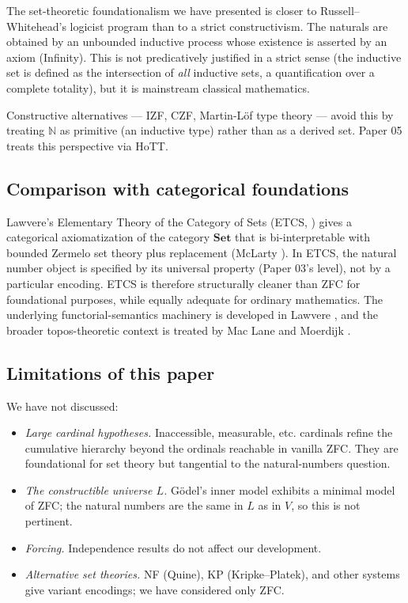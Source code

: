 \documentclass[12pt]{article}
\theoremstyle{definition}
\theoremstyle{remark}
\begin{document}
The set-theoretic foundationalism we have presented is closer to
Russell--Whitehead's logicist program than to a strict constructivism.
The naturals are obtained by an unbounded inductive process whose existence
is asserted by an axiom (Infinity). This is not predicatively justified
in a strict sense (the inductive set is defined as the intersection of
\emph{all} inductive sets, a quantification over a complete totality), but
it is mainstream classical mathematics.

Constructive alternatives --- IZF, CZF, Martin-L\"of type theory --- avoid
this by treating $\mathbb{N}$ as primitive (an inductive type) rather than
as a derived set. Paper 05 treats this perspective via HoTT.

\subsection{Comparison with categorical foundations}

Lawvere's Elementary Theory of the Category of Sets (ETCS,
\cite{lawvere1964}) gives a categorical axiomatization of the category
$\mathbf{Set}$ that is bi-interpretable with bounded Zermelo set theory
plus replacement (McLarty \cite{mclarty2004}). In ETCS, the natural number
object is specified by its universal property (Paper 03's level), not by a
particular encoding. ETCS is therefore structurally cleaner than ZFC for
foundational purposes, while equally adequate for ordinary mathematics. The
underlying functorial-semantics machinery is developed in Lawvere
\cite{lawvere1963}, and the broader topos-theoretic context is treated by
Mac Lane and Moerdijk \cite{maclane-moerdijk}.

\subsection{Limitations of this paper}

We have not discussed:
\begin{itemize}
\item \emph{Large cardinal hypotheses.} Inaccessible, measurable, etc.
cardinals refine the cumulative hierarchy beyond the ordinals reachable
in vanilla ZFC. They are foundational for set theory but tangential to
the natural-numbers question.

\item \emph{The constructible universe $L$.} G\"odel's inner model
exhibits a minimal model of ZFC; the natural numbers are the same in $L$
as in $V$, so this is not pertinent.

\item \emph{Forcing.} Independence results do not affect our development.

\item \emph{Alternative set theories.} NF (Quine), KP (Kripke--Platek),
and other systems give variant encodings; we have considered only ZFC.
\end{itemize}
\end{document}
